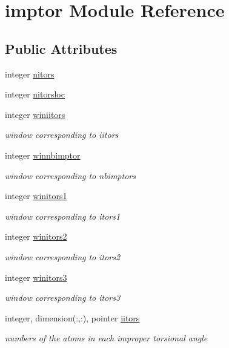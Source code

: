 \hypertarget{classimptor}{\section{imptor Module Reference}
\label{classimptor}
}
\subsection*{Public Attributes}
\begin{DoxyCompactItemize}
\item 
integer \hyperlink{classimptor_a7f604e2de3b7f5ba4b6136c0dc063862}{nitors}
\item 
integer \hyperlink{classimptor_a4a69a70b6d02dcc4c4d15eb06ede36ca}{nitorsloc}
\item 
integer \hyperlink{classimptor_ab6ee996fa64bbafa67f7b735b001c73b}{winiitors}
\begin{DoxyCompactList}\small\item\em window corresponding to iitors \end{DoxyCompactList}\item 
integer \hyperlink{classimptor_af899feb39d06c7c9761742b50128b524}{winnbimptor}
\begin{DoxyCompactList}\small\item\em window corresponding to nbimptors \end{DoxyCompactList}\item 
integer \hyperlink{classimptor_a4101ad922e3625ead34b2e133bf069df}{winitors1}
\begin{DoxyCompactList}\small\item\em window corresponding to itors1 \end{DoxyCompactList}\item 
integer \hyperlink{classimptor_a81454398c2572817c0a7a2ff0820a4b5}{winitors2}
\begin{DoxyCompactList}\small\item\em window corresponding to itors2 \end{DoxyCompactList}\item 
integer \hyperlink{classimptor_a84ab3e374ca6d4e829a5452adee96903}{winitors3}
\begin{DoxyCompactList}\small\item\em window corresponding to itors3 \end{DoxyCompactList}\item 
integer, dimension(\-:,\-:), pointer \hyperlink{classimptor_a3be3642c78d002723aa963ccb9f9bc80}{iitors}
\begin{DoxyCompactList}\small\item\em numbers of the atoms in each improper torsional angle \end{DoxyCompactList}\item 

\end{DoxyCompactItemize}
